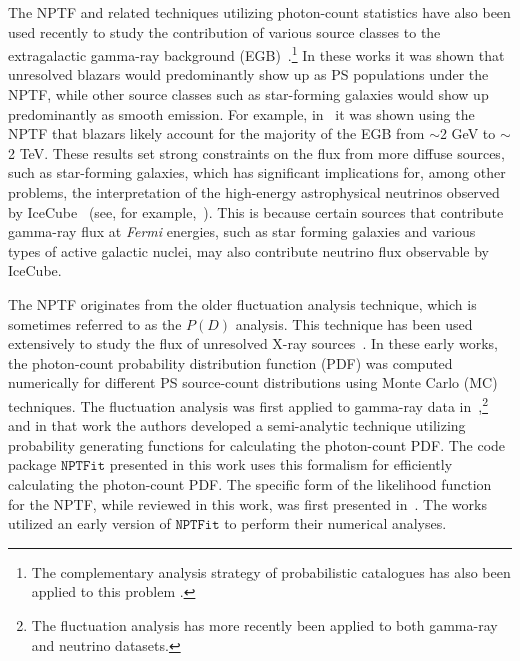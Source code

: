 The NPTF and related techniques utilizing photon-count statistics have also been used recently to study the contribution of various source classes to the extragalactic gamma-ray background (EGB)~\cite{Malyshev:2011zi,Zechlin:2015wdz,TheFermi-LAT:2015ykq,Zechlin:2016pme,Lisanti:2016jub}.\footnote{The complementary analysis strategy of probabilistic catalogues has also been applied to this problem \cite{Daylan:2016tia}.}  In these works it was shown that unresolved blazars would predominantly show up as PS populations under the NPTF, while other source classes such as star-forming galaxies would show up predominantly as smooth emission.  For example, in~\cite{Lisanti:2016jub} it was shown using the NPTF that blazars likely account for the majority of the EGB from $\sim$2 GeV to $\sim$2 TeV.  These results set strong constraints on the flux from more diffuse sources, such as star-forming galaxies, which has significant implications for, among other problems, the interpretation of the high-energy astrophysical neutrinos observed by IceCube~\cite{Aartsen:2013bka,Aartsen:2013jdh,Aartsen:2015knd,Aartsen:2015rwa} (see, for example,~\cite{Bechtol:2015uqb,Murase:2016gly}).  This is because certain sources that contribute gamma-ray flux at {\it Fermi} energies, such as star forming galaxies and various types of active galactic nuclei, may also contribute neutrino flux observable by IceCube.   

The NPTF originates from the older fluctuation analysis technique, which is sometimes referred to as the $P(D)$ analysis.  This technique has been used extensively to study the flux of unresolved X-ray sources~\cite{hasinger1993,1993MNRAS.262..619G,Gendreau:1997di,Perri:2000fv,Miyaji:2001dp}.  In these early works, the photon-count probability distribution function (PDF) was computed numerically for different PS source-count distributions using Monte Carlo (MC) techniques.  The fluctuation analysis was first applied to gamma-ray data in~\cite{Malyshev:2011zi},\footnote{The fluctuation analysis has more recently been applied to both gamma-ray \cite{Feyereisen:2015cea} and neutrino \cite{Feyereisen:2016fzb} datasets.} and in that work the authors developed a semi-analytic technique utilizing probability generating functions for calculating the photon-count PDF.  The code package $\texttt{NPTFit}$ presented in this work uses this formalism for efficiently calculating the photon-count PDF.  The specific form of the likelihood function for the NPTF, while reviewed in this work, was first presented in~\cite{Lee:2015fea}.  The works~\cite{Lee:2015fea,Linden:2016rcf,Lisanti:2016jub} utilized an early version of $\texttt{NPTFit}$ to perform their numerical analyses. 

